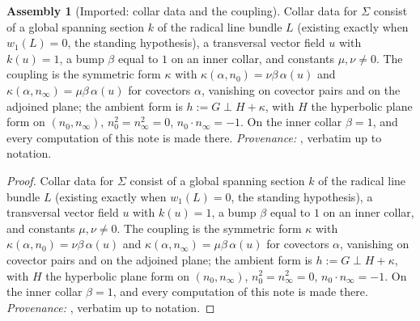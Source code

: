\documentclass[11pt]{article}
\theoremstyle{definition}
\newtheorem{assembled}[theorem]{Assembly}
\theoremstyle{plain}
\providecommand{\Sig}{}\renewcommand{\Sig}{\Sigma}
\providecommand{\nInf}{}\renewcommand{\nInf}{n_\infty}
\providecommand{\nO}{}\renewcommand{\nO}{n_0}
\providecommand{\shL}{}\renewcommand{\shL}{L}
\begin{document}
\begin{assembled}[Imported: collar data and the coupling]\label{c:three-routes.imported-collar-data-coupling}
Collar data for $\Sig$ consist of a global spanning section $k$ of the radical line bundle $\shL$ (existing exactly when $w_1(\shL) = 0$, the standing hypothesis), a transversal vector field $u$ with $k(u) = 1$, a bump $\beta$ equal to $1$ on an inner collar, and constants $\mu, \nu \neq 0$. The coupling is the symmetric form $\kappa$ with $\kappa(\alpha, \nO) = \nu\beta\,\alpha(u)$ and $\kappa(\alpha, \nInf) = \mu\beta\,\alpha(u)$ for covectors $\alpha$, vanishing on covector pairs and on the adjoined plane; the ambient form is $h := G \perp H + \kappa$, with $H$ the hyperbolic plane form on $(\nO, \nInf)$, $\nO^2 = \nInf^2 = 0$, $\nO \cdot \nInf = -1$. On the inner collar $\beta = 1$, and every computation of this note is made there. \emph{Provenance:} \cite[Def.~4.1]{ButlerT4}, verbatim up to notation.
\end{assembled}
\begin{proof}
Collar data for $\Sig$ consist of a global spanning section $k$ of the radical line bundle $\shL$ (existing exactly when $w_1(\shL) = 0$, the standing hypothesis), a transversal vector field $u$ with $k(u) = 1$, a bump $\beta$ equal to $1$ on an inner collar, and constants $\mu, \nu \neq 0$. The coupling is the symmetric form $\kappa$ with $\kappa(\alpha, \nO) = \nu\beta\,\alpha(u)$ and $\kappa(\alpha, \nInf) = \mu\beta\,\alpha(u)$ for covectors $\alpha$, vanishing on covector pairs and on the adjoined plane; the ambient form is $h := G \perp H + \kappa$, with $H$ the hyperbolic plane form on $(\nO, \nInf)$, $\nO^2 = \nInf^2 = 0$, $\nO \cdot \nInf = -1$. On the inner collar $\beta = 1$, and every computation of this note is made there. \emph{Provenance:} \cite[Def.~4.1]{ButlerT4}, verbatim up to notation.

\end{proof}
\end{document}
